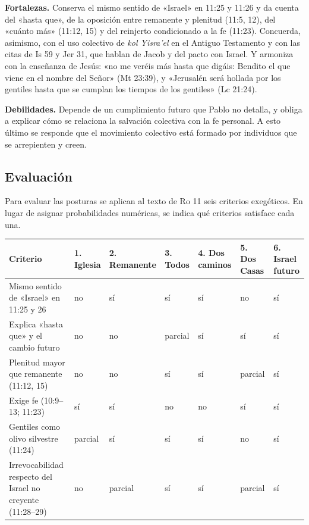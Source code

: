 \textbf{Fortalezas.} Conserva el mismo sentido de «Israel» en 11:25 y 11:26 y da cuenta del «hasta que», de la oposición entre remanente y plenitud (11:5, 12), del «cuánto más» (11:12, 15) y del reinjerto condicionado a la fe (11:23). Concuerda, asimismo, con el uso colectivo de \emph{kol Yisra'el} en el Antiguo Testamento y con las citas de Is 59 y Jer 31, que hablan de Jacob y del pacto con Israel. Y armoniza con la enseñanza de Jesús: «no me veréis más hasta que digáis: Bendito el que viene en el nombre del Señor» (Mt 23:39), y «Jerusalén será hollada por los gentiles hasta que se cumplan los tiempos de los gentiles» (Lc 21:24).

\textbf{Debilidades.} Depende de un cumplimiento futuro que Pablo no detalla, y obliga a explicar cómo se relaciona la salvación colectiva con la fe personal. A esto último se responde que el movimiento colectivo está formado por individuos que se arrepienten y creen.

\subsection{Evaluación}
Para evaluar las posturas se aplican al texto de Ro 11 seis criterios exegéticos. En lugar de asignar probabilidades numéricas, se indica qué criterios satisface cada una.

\begin{center}\footnotesize
\renewcommand{\arraystretch}{1.3}
\begin{tabular}{>{\RaggedRight\arraybackslash}p{4.3cm}>{\centering\arraybackslash}p{1.3cm}>{\centering\arraybackslash}p{1.3cm}>{\centering\arraybackslash}p{1.3cm}>{\centering\arraybackslash}p{1.3cm}>{\centering\arraybackslash}p{1.3cm}>{\centering\arraybackslash}p{1.3cm}}
\toprule
\textbf{Criterio} & \textbf{1. Iglesia} & \textbf{2. Rema\-nente} & \textbf{3. Todos} & \textbf{4. Dos caminos} & \textbf{5. Dos Casas} & \textbf{6. Israel futuro}\\
\midrule
Mismo sentido de «Israel» en 11:25 y 26 & no & sí & sí & sí & no & sí\\
Explica «hasta que» y el cambio futuro & no & no & parcial & sí & sí & sí\\
Plenitud mayor que remanente (11:12, 15) & no & no & sí & sí & parcial & sí\\
Exige fe (10:9--13; 11:23) & sí & sí & no & no & sí & sí\\
Gentiles como olivo silvestre (11:24) & parcial & sí & sí & sí & no & sí\\
Irrevocabilidad respecto del Israel no creyente (11:28--29) & no & parcial & sí & sí & parcial & sí\\
\bottomrule
\end{tabular}\end{center}

